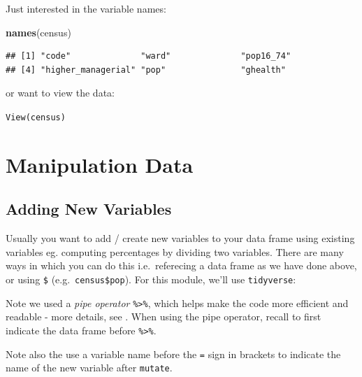 \documentclass[]{book}
\newenvironment{Shaded}{\begin{snugshade}}{\end{snugshade}}
\newcommand{\DataTypeTok}[1]{\textcolor[rgb]{0.13,0.29,0.53}{#1}}
\newcommand{\KeywordTok}[1]{\textcolor[rgb]{0.13,0.29,0.53}{\textbf{#1}}}
\newcommand{\NormalTok}[1]{#1}
\newcommand{\OperatorTok}[1]{\textcolor[rgb]{0.81,0.36,0.00}{\textbf{#1}}}
\newcommand{\StringTok}[1]{\textcolor[rgb]{0.31,0.60,0.02}{#1}}
\begin{document}
Just interested in the variable names:

\begin{Shaded}
\begin{Highlighting}[]
\KeywordTok{names}\NormalTok{(census)}
\end{Highlighting}
\end{Shaded}

\begin{verbatim}
## [1] "code"              "ward"              "pop16_74"         
## [4] "higher_managerial" "pop"               "ghealth"
\end{verbatim}

or want to view the data:

\texttt{View(census)}

\hypertarget{manipulation-data}{%
\section{Manipulation Data}\label{manipulation-data}}

\hypertarget{adding-new-variables}{%
\subsection{Adding New Variables}\label{adding-new-variables}}

Usually you want to add / create new variables to your data frame using existing variables eg. computing percentages by dividing two variables. There are many ways in which you can do this i.e.~referecing a data frame as we have done above, or using \texttt{\$} (e.g.~\texttt{census\$pop}). For this module, we'll use \texttt{tidyverse}:

\begin{Shaded}
\end{Shaded}

Note we used a \emph{pipe operator} \texttt{\%\textgreater{}\%}, which helps make the code more efficient and readable - more details, see \citet{grolemund_wickham_2019_book}. When using the pipe operator, recall to first indicate the data frame before \texttt{\%\textgreater{}\%}.

Note also the use a variable name before the \texttt{=} sign in brackets to indicate the name of the new variable after \texttt{mutate}.
\end{document}
